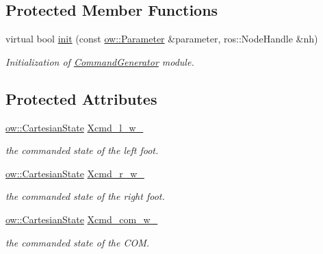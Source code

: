 \subsection*{Protected Member Functions}
\begin{DoxyCompactItemize}
\item 
virtual bool \hyperlink{classow__cmd__gen_1_1CommandGenerator_ab36dd341b8d384aa134ed3ea8f4ae086}{init} (const \hyperlink{classow_1_1Parameter}{ow\+::\+Parameter} \&parameter, ros\+::\+Node\+Handle \&nh)\hypertarget{classow__cmd__gen_1_1CommandGenerator_ab36dd341b8d384aa134ed3ea8f4ae086}{}\label{classow__cmd__gen_1_1CommandGenerator_ab36dd341b8d384aa134ed3ea8f4ae086}

\begin{DoxyCompactList}\small\item\em Initialization of \hyperlink{classow__cmd__gen_1_1CommandGenerator}{Command\+Generator} module. \end{DoxyCompactList}\end{DoxyCompactItemize}
\subsection*{Protected Attributes}
\begin{DoxyCompactItemize}
\item 
\hyperlink{classow__core_1_1CartesianState}{ow\+::\+Cartesian\+State} \hyperlink{classow__cmd__gen_1_1CommandGenerator_ae64c72f2b22c7ac140161b27864b03e0}{Xcmd\+\_\+l\+\_\+w\+\_\+}\hypertarget{classow__cmd__gen_1_1CommandGenerator_ae64c72f2b22c7ac140161b27864b03e0}{}\label{classow__cmd__gen_1_1CommandGenerator_ae64c72f2b22c7ac140161b27864b03e0}

\begin{DoxyCompactList}\small\item\em the commanded state of the left foot. \end{DoxyCompactList}\item 
\hyperlink{classow__core_1_1CartesianState}{ow\+::\+Cartesian\+State} \hyperlink{classow__cmd__gen_1_1CommandGenerator_ad0b3bf220eb3e9158f5deee0cd4f0e00}{Xcmd\+\_\+r\+\_\+w\+\_\+}\hypertarget{classow__cmd__gen_1_1CommandGenerator_ad0b3bf220eb3e9158f5deee0cd4f0e00}{}\label{classow__cmd__gen_1_1CommandGenerator_ad0b3bf220eb3e9158f5deee0cd4f0e00}

\begin{DoxyCompactList}\small\item\em the commanded state of the right foot. \end{DoxyCompactList}\item 
\hyperlink{classow__core_1_1CartesianState}{ow\+::\+Cartesian\+State} \hyperlink{classow__cmd__gen_1_1CommandGenerator_ac8ea2de73e1b6a5095b1a7d5e7dc5044}{Xcmd\+\_\+com\+\_\+w\+\_\+}\hypertarget{classow__cmd__gen_1_1CommandGenerator_ac8ea2de73e1b6a5095b1a7d5e7dc5044}{}\label{classow__cmd__gen_1_1CommandGenerator_ac8ea2de73e1b6a5095b1a7d5e7dc5044}

\begin{DoxyCompactList}\small\item\em the commanded state of the C\+OM. \end{DoxyCompactList}\end{DoxyCompactItemize}


